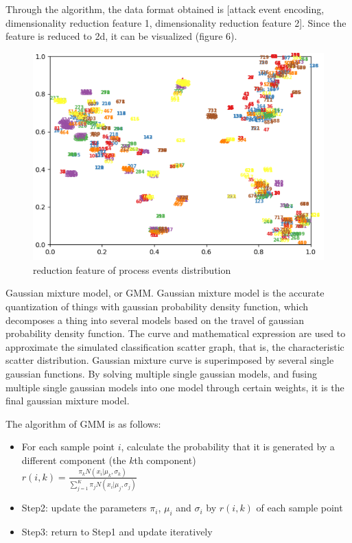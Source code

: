 \documentclass[12pt,journal,draftcls,doublespace, letterpaper,onecolumn]{IEEEtran}
\begin{document}
Through the algorithm, the data format obtained is [attack event encoding, dimensionality reduction feature 1, dimensionality reduction feature 2]. Since the feature is reduced to 2d, it can be visualized (figure 6).

\begin{figure}[htpb]
	\centering
	\includegraphics [width=1\textwidth]{proc.png}
	\caption{reduction feature of process events distribution}
	\label{fig}
\end{figure}

Gaussian mixture model, or GMM. Gaussian mixture model is the accurate quantization of things with gaussian probability density function, which decomposes a thing into several models based on the travel of gaussian probability density function. The curve and mathematical expression are used to approximate the simulated classification scatter graph, that is, the characteristic scatter distribution. Gaussian mixture curve is superimposed by several single gaussian functions. By solving multiple single gaussian models, and fusing multiple single gaussian models into one model through certain weights, it is the final gaussian mixture model.



The algorithm of GMM is as follows:

\begin{itemize}
	\item For each sample point $i$, calculate the probability that it is generated by a different component (the $k$th component) \\
	$r(i,k)=\frac{\pi_{k}N(x_{i}|\mu_{k},\sigma_{k})}{\sum_{j=1}^{K}\pi_{j}N(x_{i}|\mu_{j},\sigma_{j})}$
	
	\item Step2: update the parameters $\pi_{i}$, $\mu_{i}$ and $\sigma_{i}$ by $r(i,k)$ of each sample point
	\item Step3: return to Step1 and update iteratively
\end{itemize}
\end{document}
